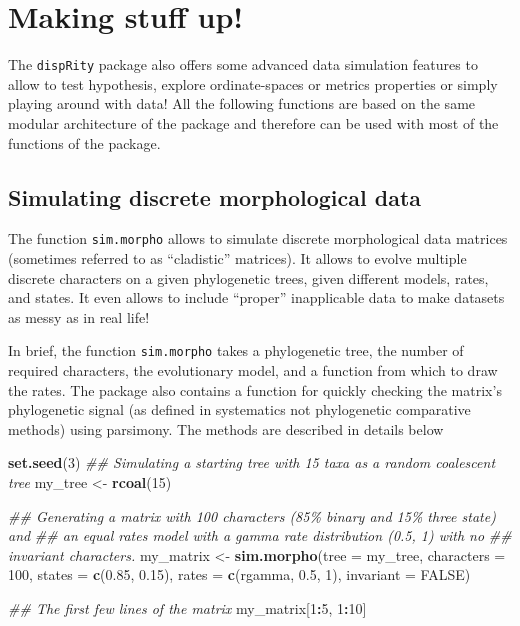 \documentclass[
]{book}
\newenvironment{Shaded}{\begin{snugshade}}{\end{snugshade}}
\newcommand{\CommentTok}[1]{\textcolor[rgb]{0.56,0.35,0.01}{\textit{#1}}}
\newcommand{\DataTypeTok}[1]{\textcolor[rgb]{0.13,0.29,0.53}{#1}}
\newcommand{\DecValTok}[1]{\textcolor[rgb]{0.00,0.00,0.81}{#1}}
\newcommand{\FloatTok}[1]{\textcolor[rgb]{0.00,0.00,0.81}{#1}}
\newcommand{\KeywordTok}[1]{\textcolor[rgb]{0.13,0.29,0.53}{\textbf{#1}}}
\newcommand{\NormalTok}[1]{#1}
\newcommand{\OperatorTok}[1]{\textcolor[rgb]{0.81,0.36,0.00}{\textbf{#1}}}
\newcommand{\OtherTok}[1]{\textcolor[rgb]{0.56,0.35,0.01}{#1}}
\newcommand{\StringTok}[1]{\textcolor[rgb]{0.31,0.60,0.02}{#1}}
\begin{document}
\hypertarget{making-stuff-up}{%
\chapter{Making stuff up!}\label{making-stuff-up}}

The \texttt{dispRity} package also offers some advanced data simulation features to allow to test hypothesis, explore ordinate-spaces or metrics properties or simply playing around with data!
All the following functions are based on the same modular architecture of the package and therefore can be used with most of the functions of the package.

\hypertarget{simulating-discrete-morphological-data}{%
\section{Simulating discrete morphological data}\label{simulating-discrete-morphological-data}}

The function \texttt{sim.morpho} allows to simulate discrete morphological data matrices (sometimes referred to as ``cladistic'' matrices).
It allows to evolve multiple discrete characters on a given phylogenetic trees, given different models, rates, and states.
It even allows to include ``proper'' inapplicable data to make datasets as messy as in real life!

In brief, the function \texttt{sim.morpho} takes a phylogenetic tree, the number of required characters, the evolutionary model, and a function from which to draw the rates.
The package also contains a function for quickly checking the matrix's phylogenetic signal (as defined in systematics not phylogenetic comparative methods) using parsimony.
The methods are described in details below

\begin{Shaded}
\begin{Highlighting}[]
\KeywordTok{set.seed}\NormalTok{(}\DecValTok{3}\NormalTok{)}
\CommentTok{\#\# Simulating a starting tree with 15 taxa as a random coalescent tree}
\NormalTok{my\_tree \textless{}{-}}\StringTok{ }\KeywordTok{rcoal}\NormalTok{(}\DecValTok{15}\NormalTok{)}

\CommentTok{\#\# Generating a matrix with 100 characters (85\% binary and 15\% three state) and}
\CommentTok{\#\# an equal rates model with a gamma rate distribution (0.5, 1) with no }
\CommentTok{\#\# invariant characters.}
\NormalTok{my\_matrix \textless{}{-}}\StringTok{ }\KeywordTok{sim.morpho}\NormalTok{(}\DataTypeTok{tree =}\NormalTok{ my\_tree, }\DataTypeTok{characters =} \DecValTok{100}\NormalTok{, }\DataTypeTok{states =} \KeywordTok{c}\NormalTok{(}\FloatTok{0.85}\NormalTok{,}
    \FloatTok{0.15}\NormalTok{), }\DataTypeTok{rates =} \KeywordTok{c}\NormalTok{(rgamma, }\FloatTok{0.5}\NormalTok{, }\DecValTok{1}\NormalTok{), }\DataTypeTok{invariant =} \OtherTok{FALSE}\NormalTok{)}

\CommentTok{\#\# The first few lines of the matrix}
\NormalTok{my\_matrix[}\DecValTok{1}\OperatorTok{:}\DecValTok{5}\NormalTok{, }\DecValTok{1}\OperatorTok{:}\DecValTok{10}\NormalTok{]}
\end{Highlighting}
\end{Shaded}
\end{document}
